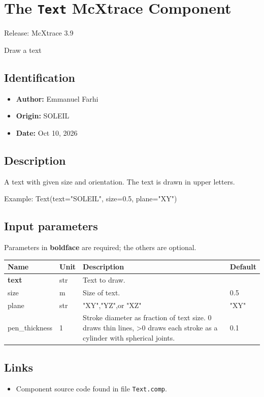 \section{The \texttt{Text} McXtrace Component}
Release: McXtrace 3.9

Draw a text

\subsection*{Identification}
\begin{itemize}
  \item \textbf{Author:} Emmanuel Farhi
  \item \textbf{Origin:} SOLEIL
  \item \textbf{Date:} Oct 10, 2026
\end{itemize}

\subsection*{Description}
A text with given size and orientation. The text is drawn in upper letters.

Example: Text(text="SOLEIL", size=0.5, plane="XY")

\subsection*{Input parameters}
Parameters in \textbf{boldface} are required; the others are optional.

\begin{longtable}{p{}p{}p{}p{}}
\toprule
\textbf{Name} & \textbf{Unit} & \textbf{Description} & \textbf{Default} \\
\midrule
\endhead
\textbf{text} & str & Text to draw. &  \\
size & m & Size of text. & 0.5 \\
plane & str & "XY","YZ",or "XZ" & "XY" \\
pen\_thickness & 1 & Stroke diameter as fraction of text size. 0 draws thin lines, \textgreater{}0 draws each stroke as a cylinder with spherical joints. & 0.1 \\
\bottomrule
\end{longtable}

\subsection*{Links}
\begin{itemize}
  \item Component source code found in file \texttt{Text.comp}.
\end{itemize}

